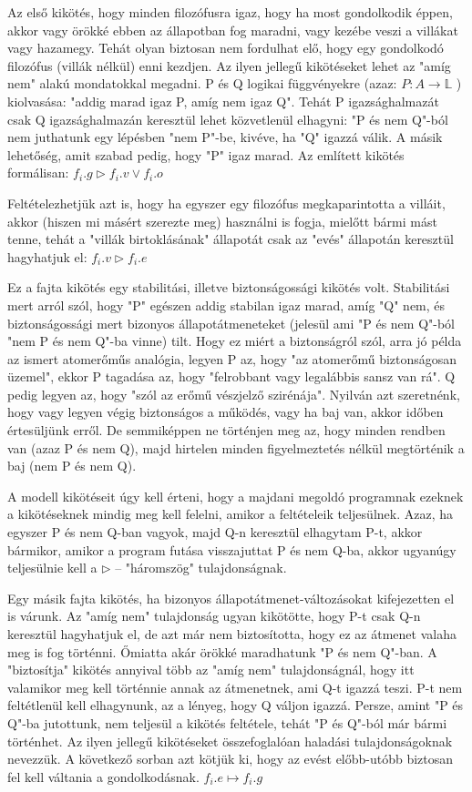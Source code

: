 \documentclass{article}
\begin{document}
Az első kikötés, hogy minden filozófusra igaz, hogy ha most gondolkodik éppen, akkor vagy örökké ebben az állapotban fog maradni, vagy kezébe veszi a villákat vagy hazamegy. Tehát olyan biztosan nem fordulhat elő, hogy egy gondolkodó filozófus (villák nélkül) enni kezdjen. Az ilyen jellegű kikötéseket lehet az "amíg nem" alakú mondatokkal megadni. P és Q logikai függvényekre (azaz: $P:A \rightarrow \mathbb{L} $ )
kiolvasása: "addig marad igaz P, amíg nem igaz Q". Tehát P igazsághalmazát csak Q igazsághalmazán keresztül lehet közvetlenül elhagyni: "P és nem Q"-ból nem juthatunk egy lépésben "nem P"-be,
kivéve, ha "Q" igazzá válik. A másik lehetőség, amit szabad pedig, hogy "P" igaz marad. Az említett kikötés formálisan: $f_i.g \triangleright f_i.v \lor f_i.o$

Feltételezhetjük azt is, hogy ha egyszer egy filozófus megkaparintotta a villáit, akkor (hiszen mi másért szerezte meg) használni is fogja, mielőtt bármi mást tenne, tehát a "villák birtoklásának" állapotát csak az "evés" állapotán keresztül hagyhatjuk el: $f_i.v \triangleright f_i.e $

Ez a fajta kikötés egy stabilitási, illetve biztonságossági kikötés volt. Stabilitási mert arról szól, hogy "P" egészen addig stabilan igaz marad, amíg "Q" nem, és biztonságossági mert bizonyos állapotátmeneteket (jelesül ami "P és nem Q"-ból "nem P és nem Q"-ba vinne) tilt. Hogy ez miért a biztonságról szól, arra jó példa az ismert atomerőműs analógia, legyen P az, hogy "az atomerőmű biztonságosan üzemel", ekkor P tagadása az, hogy "felrobbant vagy legalábbis sansz van rá". Q pedig legyen az, hogy "szól az erőmű vészjelző szirénája". Nyilván azt szeretnénk, hogy vagy legyen végig biztonságos a
működés, vagy ha baj van, akkor időben értesüljünk erről. De semmiképpen ne történjen meg az, hogy minden rendben van (azaz P és nem Q), majd hirtelen minden figyelmeztetés nélkül megtörténik a baj (nem P és nem Q).

A modell kikötéseit úgy kell érteni, hogy a majdani megoldó programnak ezeknek a kikötéseknek mindig meg kell felelni, amikor a feltételeik teljesülnek. Azaz, ha egyszer P és nem Q-ban vagyok, majd Q-n keresztül elhagytam P-t, akkor bármikor, amikor a program futása visszajuttat P és nem Q-ba, akkor ugyanúgy teljesülnie kell a  $\triangleright$ -- "háromszög" tulajdonságnak.

Egy másik fajta kikötés, ha bizonyos állapotátmenet-változásokat kifejezetten el is várunk. Az "amíg nem" tulajdonság ugyan kikötötte, hogy P-t csak Q-n keresztül hagyhatjuk el, de azt már nem biztosította, hogy ez az átmenet valaha meg is fog történni. Őmiatta akár örökké maradhatunk "P és nem Q"-ban. A "biztosítja" kikötés annyival több az "amíg nem" tulajdonságnál, hogy itt valamikor meg kell történnie annak az átmenetnek, ami Q-t igazzá teszi. P-t nem feltétlenül kell elhagynunk, az a lényeg, hogy Q váljon igazzá. Persze, amint "P és Q"-ba jutottunk, nem teljesül a kikötés feltétele, tehát "P és Q"-ból már bármi történhet. Az ilyen jellegű kikötéseket összefoglalóan haladási tulajdonságoknak nevezzük. A következő sorban azt kötjük ki, hogy az evést előbb-utóbb biztosan fel kell váltania a gondolkodásnak. $f_i.e \mapsto f_i.g$
\end{document}
